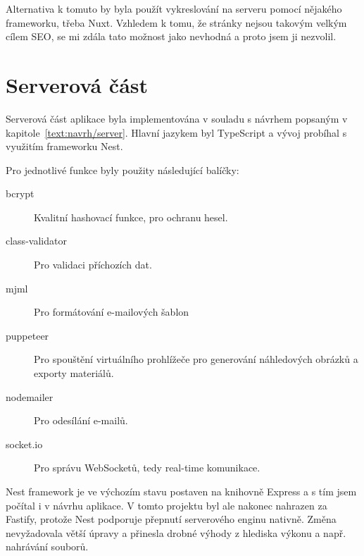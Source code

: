 Alternativa k tomuto by byla použít vykreslování na serveru pomocí nějakého frameworku, třeba Nuxt.
Vzhledem k tomu, že stránky nejsou takovým velkým cílem SEO, se mi zdála tato možnost jako nevhodná a proto jsem ji nezvolil.



\section{Serverová část}\label{text:realizace/server}

Serverová část aplikace byla implementována v souladu s návrhem popsaným v kapitole~\ref{text:navrh/server}. 
Hlavní jazykem byl TypeScript a vývoj probíhal s využitím frameworku Nest. 

Pro jednotlivé funkce byly použity následující balíčky:

\begin{description}
    \item[bcrypt] Kvalitní hashovací funkce, pro ochranu hesel.
    \item[class-validator] Pro validaci příchozích dat.
    \item[mjml] Pro formátování e-mailových šablon
    \item[puppeteer] Pro spouštění virtuálního prohlížeče pro generování náhledových obrázků a exporty materiálů.
    \item[nodemailer] Pro odesílání e-mailů.
    \item[socket.io] Pro správu WebSocketů, tedy real-time komunikace.
\end{description}

Nest framework je ve výchozím stavu postaven na knihovně Express a s tím jsem počítal i v návrhu aplikace.
V tomto projektu byl ale nakonec nahrazen za Fastify, protože Nest podporuje přepnutí serverového enginu nativně. 
Změna nevyžadovala větší úpravy a přinesla drobné výhody z hlediska výkonu a např. nahrávání souborů.

